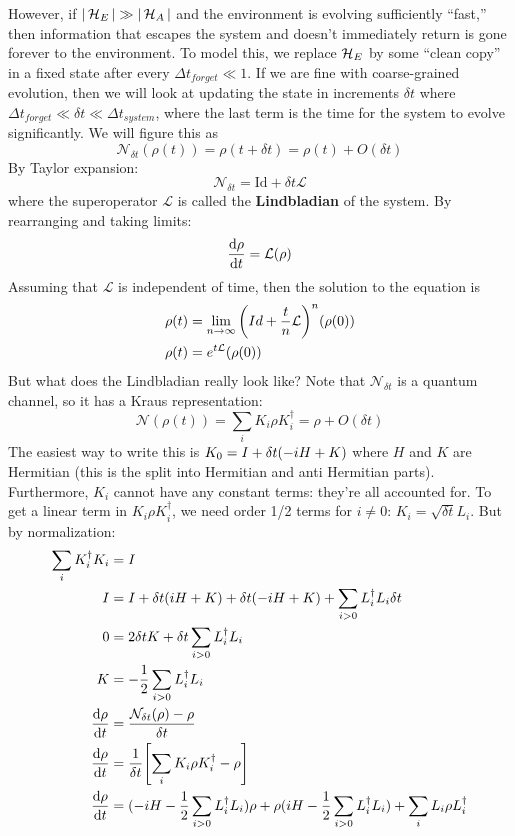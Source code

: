 However, if $|\operatorname{\mathcal{H}}_E| \gg |\operatorname{\mathcal{H}}_A|$ and the environment is evolving sufficiently ``fast,'' then information
that escapes the system and doesn't immediately return is gone forever to the environment. To model this,
we replace $\operatorname{\mathcal{H}}_E$ by some ``clean copy'' in a fixed state after every $\Delta t_{forget} \ll 1$. If we are fine with coarse-grained evolution,
then we will look at updating the state in increments $\delta t$
where $\Delta t_{forget} \ll \delta t \ll \Delta t_{system}$, where the last term is the time for the
system to evolve significantly. We will figure this as
\[ \mathcal{N}_{\delta t}(\rho(t)) = \rho(t + \delta t) = \rho(t) + O(\delta t) \]
By Taylor expansion:
\[ \mathcal{N}_{\delta t} = \textrm{Id} + \delta t \mathcal{L} \]
where the superoperator $\mathcal{L}$ is called the \textbf{Lindbladian} of the system. By
rearranging and taking limits:
\[ \dv{\rho}{t} = \mathcal{L}(\rho) \]
Assuming that $\mathcal{L}$ is independent of time, then the solution to the equation is
\begin{align*}
    \rho(t) &= \lim_{n \to \infty} \qty(Id + \frac{t}{n} \mathcal{L})^n \qty(\rho(0)) \\
    \rho(t) &= e^{t \mathcal{L}}(\rho(0))
\end{align*}
But what does the Lindbladian really look like? Note that $\mathcal{N}_{\delta t}$ is a quantum channel,
so it has a Kraus representation:
\[ \mathcal{N}(\rho(t)) = \sum_{i} K_i \rho K_i^{\dagger} = \rho + O(\delta t) \]
The easiest way to write this is $K_0 = I + \delta t \qty(-iH + K)$ where $H$ and $K$ are Hermitian (this is the split into
Hermitian and anti Hermitian parts). Furthermore, $K_i$ cannot have any constant terms: they're all accounted for.
To get a linear term in $K_i \rho K_i^{\dagger}$, we need order 1/2 terms for $i \neq 0$:
$K_i = \sqrt{\delta t} L_i$. But by normalization:
\begin{align*}
    \sum_i K_i^{\dagger} K_i &= I \\
    I &= I + \delta t(iH + K) + \delta t(-iH + K) + \sum_{i > 0} L_i^{\dagger} L_i \delta t \\
    0 &= 2 \delta t K + \delta t \sum_{i > 0} L_i^{\dagger} L_i \\
    K &= -\frac{1}{2} \sum_{i > 0} L_i^{\dagger} L_i \\
    \dv{\rho}{t} &= \frac{\mathcal{N}_{\delta t} (\rho) - \rho}{\delta t} \\
    \dv{\rho}{t} &= \frac{1}{\delta t} \qty[\sum_i K_i \rho K_i^{\dagger} - \rho] \\
    \dv{\rho}{t} &= (-iH - \frac{1}{2} \sum_{i > 0} L_i^{\dagger} L_i)\rho + \rho (iH - \frac{1}{2}\sum_{i > 0} L_i^{\dagger} L_i) + \sum_i L_i \rho L_i^{\dagger}
\end{align*}
